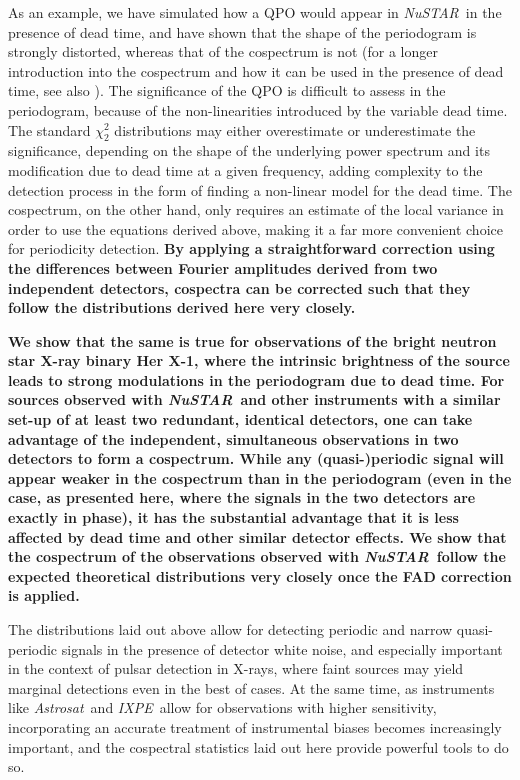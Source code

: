 \documentclass[12pt]{emulateapj}
\newcommand{\project}[1]{\textsl{#1}}
\newcommand{\nustar}{\project{NuSTAR}\xspace}
\newcommand{\astrosat}{\project{Astrosat}\xspace}
\newcommand{\ixpe}{\project{IXPE}\xspace}
\begin{document}
As an example, we have simulated how a QPO would appear in \nustar\ in the presence of dead time, and have shown that the shape of the periodogram is strongly distorted, whereas that of the cospectrum is not (for a longer introduction into the cospectrum and how it can be used in the presence of dead time, see also \citealt{Bachetti+15}). The significance of the QPO is difficult to assess in the periodogram, because of the non-linearities introduced by the variable dead time. The standard $\chi^2_2$ distributions may either overestimate or underestimate the significance, depending on the shape of the underlying power spectrum and its modification due to dead time at a given frequency, adding complexity to the detection process in the form of finding a non-linear model for the dead time. The cospectrum, on the other hand, only requires an estimate of the local variance in order to use the equations derived above, making it a far more convenient choice for periodicity detection. \textbf{By applying a straightforward correction using the differences between Fourier amplitudes derived from two independent detectors, cospectra can be corrected such that they follow the distributions derived here very closely.}

\textbf{We show that the same is true for observations of the bright neutron star X-ray binary Her X-1, where the intrinsic brightness of the source leads to strong modulations in the periodogram due to dead time. For sources observed with \nustar\ and other instruments with a similar set-up of at least two redundant, identical detectors, one can take advantage of the independent, simultaneous observations in two detectors to form a cospectrum. While any (quasi-)periodic signal will appear weaker in the cospectrum than in the periodogram (even in the case, as presented here, where the signals in the two detectors are exactly in phase), it has the substantial advantage that it is less affected by dead time and other similar detector effects. We show that the cospectrum of the observations observed with \nustar\ follow the expected theoretical distributions very closely once the FAD correction is applied.}

The distributions laid out above allow for detecting periodic and narrow quasi-periodic signals in the presence of detector white noise, and especially important in the context of pulsar detection in X-rays, where faint sources may yield marginal detections even in the best of cases. At the same time, as instruments like \astrosat\ and \ixpe\ allow for observations with higher sensitivity, incorporating an accurate treatment of instrumental biases becomes increasingly important, and the cospectral statistics laid out here provide powerful tools to do so.
\end{document}
